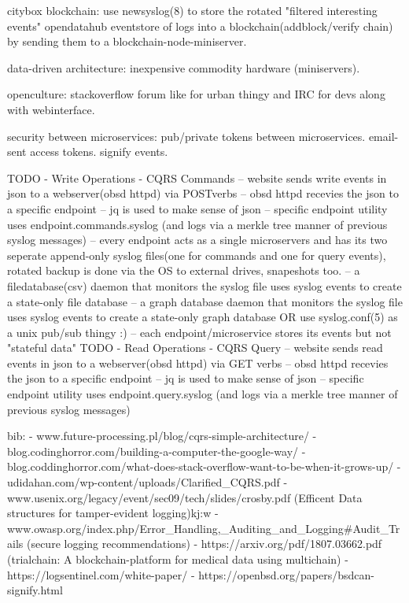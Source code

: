 citybox blockchain: use newsyslog(8) to store the rotated "filtered interesting events" opendatahub eventstore of logs into a blockchain(addblock/verify chain) by sending them to a blockchain-node-miniserver.

data-driven architecture: inexpensive commodity hardware (miniservers).

openculture: stackoverflow forum like for urban thingy and IRC for devs along with webinterface.

security between microservices: 
pub/private tokens between microservices.
email-sent access tokens.
signify events.

TODO
- Write Operations - CQRS Commands
-- website sends write events in json to a webserver(obsd httpd) via POST\PUT verbs
-- obsd httpd recevies the json to a specific endpoint 
-- jq is used to make sense of json
-- specific endpoint utility uses endpoint.commands.syslog (and logs via a merkle tree manner of previous syslog messages)
-- every endpoint acts as a single microservers and has its two seperate append-only syslog files(one for commands and one for query events), rotated backup is done via the OS to external drives, snapeshots too. 
-- a filedatabase(csv) daemon that monitors the syslog file uses syslog events to create a state-only file database 
-- a graph database daemon that monitors the syslog file uses syslog events to create a state-only graph database
OR use 	syslog.conf(5) as a unix pub/sub thingy :)
-- each endpoint/microservice stores its events but not "stateful data" 
TODO
- Read Operations - CQRS Query
-- website sends read events in json to a webserver(obsd httpd) via GET verbs
-- obsd httpd recevies the json to a specific endpoint 
-- jq is used to make sense of json
-- specific endpoint utility uses endpoint.query.syslog (and logs via a merkle tree manner of previous syslog messages)

bib:
- www.future-processing.pl/blog/cqrs-simple-architecture/
- blog.codinghorror.com/building-a-computer-the-google-way/
- blog.coddinghorror.com/what-does-stack-overflow-want-to-be-when-it-grows-up/
- udidahan.com/wp-content/uploads/Clarified_CQRS.pdf
- www.usenix.org/legacy/event/sec09/tech/slides/crosby.pdf (Efficent Data structures for tamper-evident logging)kj:w
- www.owasp.org/index.php/Error_Handling,_Auditing_and_Logging#Audit_Trails (secure logging recommendations) 
- https://arxiv.org/pdf/1807.03662.pdf (trialchain: A blockchain-platform for medical data using multichain)
- https://logsentinel.com/white-paper/
- https://openbsd.org/papers/bsdcan-signify.html
